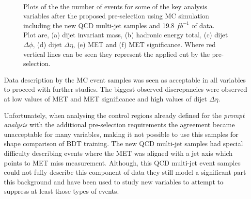 \begin{figure}[!htb]
 \\
\label{FIGURE:PreparationParkedDataAnalysis_QCDVBFMET_PreSectionVariables}
\caption{Plots of the the number of events for some of the key analysis variables after the proposed pre-selection using \gls{MC} simulation including the new \gls{QCD} multi-jet samples and 19.8 $fb^{-1}$ of data. Plot are, (a) dijet invariant mass, (b) hadronic energy total, (c) dijet $\Delta\phi$, (d) dijet $\Delta\eta$, (e) \gls{MET} and (f) \gls{MET} significance. Where red vertical lines can be seen they represent the applied cut by the pre-selection.}
\end{figure}

Data description by the \gls{MC} event samples was seen as acceptable in all variables to proceed with further studies. The biggest observed discrepancies were observed at low values of \gls{MET} and \gls{MET} significance and high values of dijet $\Delta\eta$.

Unfortunately, when analysing the control regions already defined for the \textit{prompt analysis} with the additional pre-selection requirements the agreement became unacceptable for many variables, making it not possible to use this samples for shape comparison of \gls{BDT} training. The new \gls{QCD} multi-jet samples had special difficulty describing events where the \gls{MET} was aligned with a jet axis which points to \gls{MET} miss measurement. Although, this \gls{QCD} multi-jet event samples could not fully describe this component of data they still model a significant part this background and have been used to study new variables to attempt to suppress at least those types of events. 

